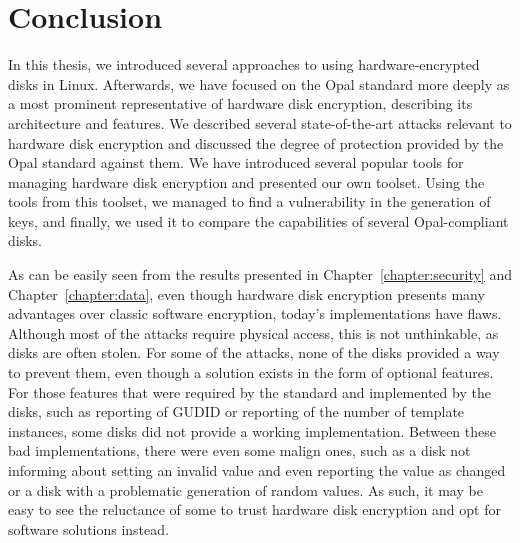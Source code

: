 

















\chapter{Conclusion}

In this thesis, we introduced several approaches to using hardware-encrypted disks in Linux. Afterwards, we have focused on the Opal standard more deeply as a most prominent representative of hardware disk encryption, describing its architecture and features.
We described several state-of-the-art attacks relevant to hardware disk encryption and discussed the degree of protection provided by the Opal standard against them.
We have introduced several popular tools for managing hardware disk encryption and presented our own toolset. 
Using the tools from this toolset, we managed to find a vulnerability in the generation of keys, and finally, we used it to compare the capabilities of several Opal-compliant disks. 


As can be easily seen from the results presented in Chapter~\ref{chapter:security} and Chapter~\ref{chapter:data},
even though hardware disk encryption presents many advantages over classic software encryption, today's implementations have flaws. Although most of the attacks require physical access, this is not unthinkable, as disks are often stolen.
For some of the attacks, none of the disks provided a way to prevent them, even though a solution exists in the form of optional features. For those features that were required by the standard and implemented by the disks, 
such as reporting of GUDID or reporting of the number of template instances,
some disks did not provide a working implementation. Between these bad implementations, there were even some malign ones, such as a disk not informing about setting an invalid value and even reporting the value as changed or a disk with a problematic generation of random values.
As such, it may be easy to see the reluctance of some to trust hardware disk encryption and opt for software solutions instead.

